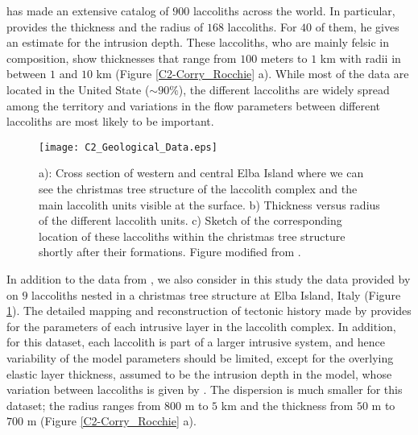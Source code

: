 \citet{E:2015tl}  has made  an extensive  catalog of  $900$ laccoliths
across  the  world.   In  particular,  \citet{E:2015tl}  provides  the
thickness and  the radius of $168$  laccoliths.  For $40$ of  them, he
gives an estimate for the  intrusion depth.  These laccoliths, who are
mainly felsic in  composition, show thicknesses that  range from $100$
meters  to $1$  km  with radii  in  between $1$  and  $10$ km  (Figure
\ref{C2-Corry_Rocchie} a).  While most of  the data are located in the
United State ($\sim 90\%$), the different laccoliths are widely spread
among  the territory  and variations  in the  flow parameters  between
different laccoliths are most likely to be important.
\begin{figure}[h!]
  \begin{center}
    \graphicspath{ {/Users/thorey/Documents/These/Manuscript/Figure/Chapter2/} }
    \texttt{[image: C2\_Geological\_Data.eps]}
    \caption{a):  Cross section  of  western and  central Elba  Island
      where we can  see the christmas tree structure  of the laccolith
      complex and the main laccolith  units visible at the surface. b)
      Thickness  versus radius  of the  different laccolith  units. c)
      Sketch of the corresponding  location of these laccoliths within
      the    christmas   tree    structure    shortly   after    their
      formations. Figure modified from \citet{Rocchi:2002jy}.}
    \label{C2_Geological_Data}
  \end{center}
\end{figure}

In addition  to the  data from \citet{E:2015tl},  we also  consider in
this  study   the  data  provided  by   \citet{Rocchi:2002jy}  on  $9$
laccoliths nested in a christmas  tree structure at Elba Island, Italy
(Figure   \ref{C2_Geological_Data}).    The   detailed   mapping   and
reconstruction  of  tectonic  history  made  by  \citet{Rocchi:2002jy}
provides for the  parameters of each intrusive layer  in the laccolith
complex. In  addition, for this dataset,  each laccolith is part  of a
larger intrusive system, and hence variability of the model parameters
should be limited,  except for the overlying  elastic layer thickness,
assumed  to be  the  intrusion  depth in  the  model, whose  variation
between laccoliths is given  by \citet{Rocchi:2002jy}.  The dispersion
is much  smaller for this dataset;  the radius ranges from  $800$ m to
$5$  km   and  the  thickness   from  $50$   m  to  $700$   m  (Figure
\ref{C2-Corry_Rocchie} a).

